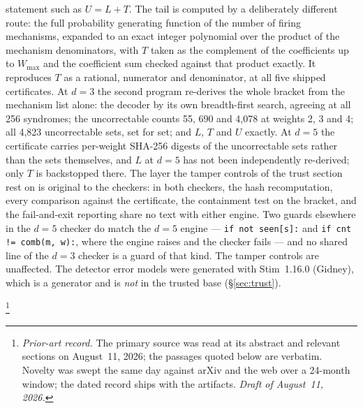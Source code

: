 \documentclass[11pt]{amsart}
\newcommand{\WMAX}{W_{\max}}
\theoremstyle{plain}
\theoremstyle{definition}
\theoremstyle{remark}
\begin{document}
{statement such as $U=L+T$. The tail is computed by a deliberately different
route: the full probability generating function of the number of firing
mechanisms, expanded to an exact integer polynomial over the product of the
mechanism denominators, with $T$ taken as the complement of the coefficients
up to $\WMAX$ and the coefficient sum checked against that product exactly.
It reproduces $T$ as a rational, numerator and denominator, at all five
shipped certificates. At $d=3$ the second program re-derives the whole
bracket from the mechanism list alone: the decoder by its own breadth-first
search, agreeing at all 256 syndromes; the uncorrectable counts 55, 690 and
4,078 at weights 2, 3 and 4; all 4,823 uncorrectable sets, set for set; and
$L$, $T$ and $U$ exactly. At $d=5$ the certificate carries per-weight
SHA-256 digests of the uncorrectable sets rather than the sets themselves,
and $L$ at $d=5$ has not been independently re-derived; only $T$ is
backstopped there.\endgraf
The layer the tamper controls of the trust section rest on is original to
the checkers: in both checkers, the hash recomputation, every comparison
against the certificate, the containment test on the bracket, and the
fail-and-exit reporting share no text with either engine. Two guards
elsewhere in the $d=5$ checker do match the $d=5$ engine --- \texttt{if not
seen[s]:} and \texttt{if cnt != comb(m, w):}, where the engine raises and
the checker fails --- and no shared line of the $d=3$ checker is a guard of
that kind. The tamper controls are unaffected. The detector error models
were generated with Stim~1.16.0
(Gidney), which is a generator and is \emph{not} in the trusted base
(\S\ref{sec:trust}).}

\thanks{\emph{Prior-art record.} The primary source \cite{MWB} was read at its
abstract and relevant sections on August~11, 2026; the passages quoted below
are verbatim. Novelty was swept the same day against arXiv and the web over a
24-month window; the dated record ships with the artifacts. \emph{Draft of
August~11, 2026.}}


\date{August 11, 2026}
\end{document}
